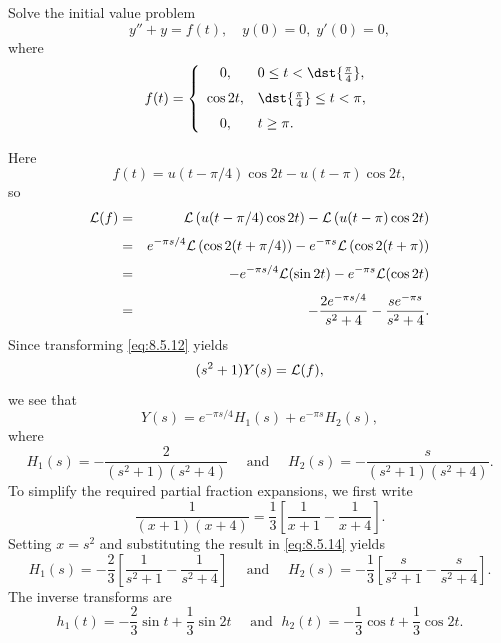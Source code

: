 \setcounter{example}{3}
\setcounter{equation}{11}
\begin{example}
  \label{example:8.5.4}\rm Solve the initial value problem
  \begin{equation}
    \label{eq:8.5.12}y''+y=f(t),\quad y(0)=0,\;y'(0)=0,
  \end{equation}
  where
  \[
    f(t)=\left\{
    \begin{array}{cl}
      0,      & 0\le t<\dst{\frac{\pi}{4}},   \\[2\jot]
      \cos2t, & \dst{\frac{\pi}{4}}\le t<\pi, \\[2\jot]
      0,      & t\ge\pi.
    \end{array}\right.
  \]
\end{example}
\setcounter{equation}{12}
\setcounter{figure}{1}
\begin{examplesolution}
\solution Here
\[
  f(t)=u(t-\pi/4)\cos2t-u(t-\pi)\cos2t,
\]
so
\begin{eqnarray*}
  {\cal L}(f) & = & {\cal L}\left(u(t-\pi/4)\cos2t\right)-{\cal L}\left(u(t-\pi)\cos2t\right)                     \\[1\jot]
              & = & e^{-{\pi s/4}}{\cal L}\left(\cos2(t+\pi/4)\right)-e^{-\pi s}{\cal L}\left(\cos2(t+\pi)\right) \\[1\jot]
              & = & -e^{-{\pi s/4}}{\cal L}(\sin2t)-e^{-\pi s}{\cal L}(\cos2t)                                    \\[1\jot]
              & = & -\frac{2e^{-{\pi s/4}}}{s^{2}+4}-\frac{se^{-\pi s}}{s^{2}+4}.
\end{eqnarray*}
Since transforming \eqref{eq:8.5.12} yields
\[
  (s^{2}+1)Y(s)={\cal L}(f),
\]
we see that
\begin{equation}
  \label{eq:8.5.13}Y(s)=e^{-{\pi s/4}}H_{1}(s)+e^{-\pi s}H_{2}(s),
\end{equation}
where
\begin{equation}
  \label{eq:8.5.14}H_{1}(s)=-\frac{2}{(s^{2}+1)(s^{2}+4)}\quad\mbox{ and }\quad H_{2}(s)=-\frac{s}{(s^{2}+1)(s^{2}+4)}.
\end{equation}
To simplify the required partial fraction expansions, we first write
\[
  \frac{1}{(x+1)(x+4)}=\frac{1}{3}\left[\frac{1}{x+1}-\frac{1}{x+4}\right].
\]
Setting $x=s^{2}$ and substituting the result in \eqref{eq:8.5.14} yields
\[
  H_{1}(s)=-\frac{2}{3}\left[\frac{1}{s^{2}+1}-\frac{1}{s^{2}+4}\right] \quad\mbox{ and }\quad H_{2}(s)=-\frac{1}{3}\left[\frac{s}{s^{2}+1}-\frac{s}{s^{2}+4}\right].
\]
The inverse transforms are
\[
  h_{1}(t)=-\frac{2}{3}\sin t+\frac{1}{3}\sin2t \quad\mbox{ and }\; h_{2}(t)=-\frac{1}{3}\cos t+\frac{1}{3}\cos2t.
\]
\end{examplesolution}

